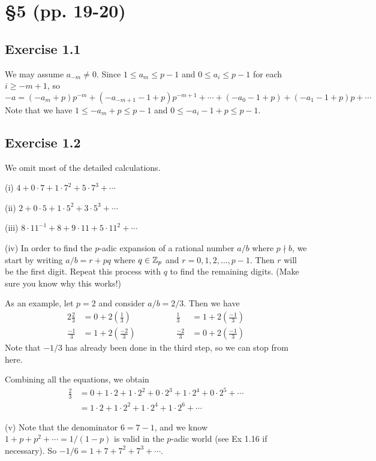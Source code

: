 \documentclass[../Koblitz.tex]{subfiles}
\begin{document}
\section*{\S5 (pp. 19-20)}

\subsection*{Exercise 1.1}
We may assume $a_{-m}\neq0$. Since $1\leq a_m \leq p-1$ and $0\leq a_i \leq p-1$ for each $i\geq-m+1$, so
$$-a = (-a_m+p)p^{-m}+(-a_{-m+1}-1+p)p^{-m+1}+\cdots+(-a_0-1+p)+(-a_1-1+p)p+\cdots$$
Note that we have $1\leq -a_m+p\leq p-1$ and $0\leq -a_i-1+p\leq p-1$.

\subsection*{Exercise 1.2}

We omit most of the detailed calculations.

(i) $4+0\cdot7+1\cdot7^2+5\cdot7^3+\cdots$

(ii) $2+0\cdot5+1\cdot5^2+3\cdot5^3+\cdots$

(iii) $8\cdot11^{-1}+8+9\cdot11+5\cdot11^2+\cdots$

(iv) In order to find the $p$-adic expansion of a rational number $a/b$ where $p\nmid b$, we start by writing $a/b=r+pq$ where $q\in\mathbb{Z}_p$ and $r=0,1,2,\ldots,p-1$. Then $r$ will be the first digit. Repeat this process with $q$ to find the remaining digits. (Make sure you know why this works!)

As an example, let $p=2$ and consider $a/b=2/3$. Then we have
\begin{alignat*}{2}
\frac{2}{3}&=0 + 2\left(\frac{1}{3}\right) &\qquad\qquad \frac{1}{3}&=1 + 2\left(\frac{-1}{3}\right) \\
\frac{-1}{3}&=1 + 2\left(\frac{-2}{3}\right) &\qquad\qquad
\frac{-2}{3}&=0 + 2\left(\frac{-1}{3}\right)
\end{alignat*}
Note that $-1/3$ has already been done in the third step, so we can stop from here.

Combining all the equations, we obtain \begin{align*}
\frac{2}{3} &= 0+1\cdot2+1\cdot2^2+0\cdot2^3+1\cdot2^4+0\cdot2^5+\cdots \\
&= 1\cdot2+1\cdot2^2+1\cdot2^4+1\cdot2^6+\cdots
\end{align*}

(v) Note that the denominator $6=7-1$, and we know $1+p+p^2+\cdots=1/(1-p)$ is valid in the $p$-adic world (see Ex 1.16 if necessary). So $-1/6=1+7+7^2+7^3+\cdots$.
\end{document}
